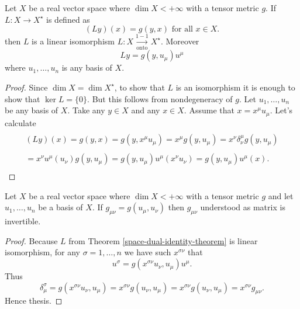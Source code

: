 \documentclass[main.tex]{subfiles}
\begin{document}
\begin{theorem}
\label{space-dual-identity-theorem}
Let $X$ be a real vector space where $\dim X < +\infty$ with a tensor metric $g$. If $L: X\to X^\star$ is defined as
\begin{equation}
(Ly)(x) = g(y, x) \text{ for all } x\in X. 
\end{equation}
then $L$ is a linear isomorphism  $L:X\underset{\text{onto}}{\overset{1-1}{\to}} X^\star$.
Moreover
\begin{equation}
\label{space-dual-identity}
L y = g(y, u_\mu) u^\mu
\end{equation} 
where $u_1, \dots, u_n$ is any basis of $X$.
\end{theorem}
\begin{proof}
Since $\dim X = \dim X^\star$, to show that $L$ is an isomorphism it is enough to show that $\ker L = \{0\}$. But this follows from nondegeneracy of $g$. Let $u_1, \dots, u_n$ be any basis of $X$.  Take any $y\in X$ and any $x\in X$. Assume that $x = x^\mu u_\mu$.
Let's calculate
\begin{multline*}
\\
(Ly)(x) = g(y, x) = g(y, x^\mu u_\mu)= x^\mu g(y, u_\mu) = x^\nu \delta^\mu_\nu g(y, u_\mu)\\
\\ = x^\nu u^\mu(u_\nu) g(y, u_\mu) = g(y, u_\mu) u^\mu(x^\nu u_\nu) = g(y,u_\mu)u^\mu(x).
\\
\end{multline*} 
\end{proof}

\begin{lemma}
\label{metric-tensor-inversibility}
Let $X$ be a real vector space where $\dim X < +\infty$ with a tensor metric $g$ and let $u_1, \dots, u_n$ be a basis of $X$. If $g_{\mu\nu} = g(u_\mu, u_\nu)$ then $g_{\mu\nu}$ understood as matrix is invertible.
\end{lemma}
\begin{proof}
Because $L$ from Theorem \ref{space-dual-identity-theorem} is linear isomorphism, for any $\sigma = 1, \dots, n$ we have such $x^{\sigma\nu}$ that
\begin{equation}
u^\sigma = g(x^{\sigma\nu} u_\nu, u_\mu) u^\mu.
\end{equation}
Thus 
\begin{equation}
\delta^\sigma_\mu = g(x^{\sigma\nu} u_\nu, u_\mu) = x^{\sigma\nu} g(u_\nu, u_\mu) = x^{\sigma\nu} g(u_\nu, u_\mu) = x^{\sigma\nu} g_{\mu\nu}.
\end{equation}
Hence thesis.
\end{proof}
\end{document}
